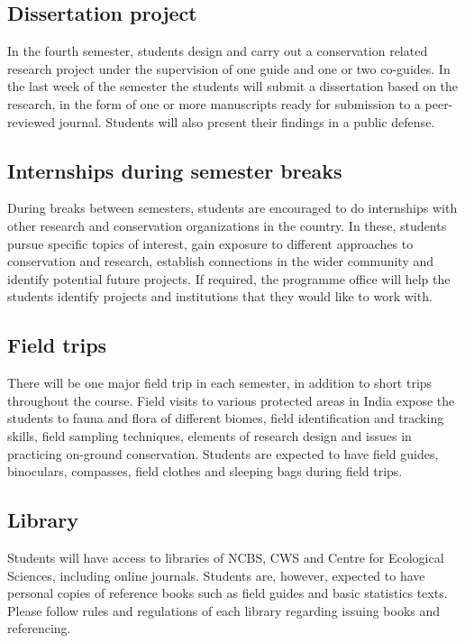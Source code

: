 \documentclass[a4paper]{extarticle}
\begin{document}
\subsection{Dissertation project}
In the fourth semester, students design and carry out a conservation
related research project under the supervision of one guide and one or two co-guides. In the
last week of the semester the students will submit a dissertation based on the research, in the
form of one or more manuscripts ready for submission to a peer-reviewed journal. Students
will also present their findings in a public defense.

\subsection{Internships during semester breaks}
During breaks between semesters, students are
encouraged to do internships with other research and conservation organizations in the
country. In these, students pursue specific topics of interest, gain exposure to different
approaches to conservation and research, establish connections in the wider community and
identify potential future projects. If required, the programme office will help the students
identify projects and institutions that they would like to work with.

\subsection{Field trips} There will be one major field trip in each semester, in addition to short trips
throughout the course. Field visits to various protected areas in India expose the students to
fauna and flora of different biomes, field identification and tracking skills, field sampling
techniques, elements of research design and issues in practicing on-ground conservation.
Students are expected to have field guides, binoculars, compasses, field clothes and sleeping
bags during field trips.

	
\subsection{Library}
Students will have access to libraries of NCBS, CWS and Centre for Ecological
Sciences, including online journals. Students are, however, expected to have personal copies
of reference books such as field guides and basic statistics texts. Please follow rules and
regulations of each library regarding issuing books and referencing.
\end{document}
